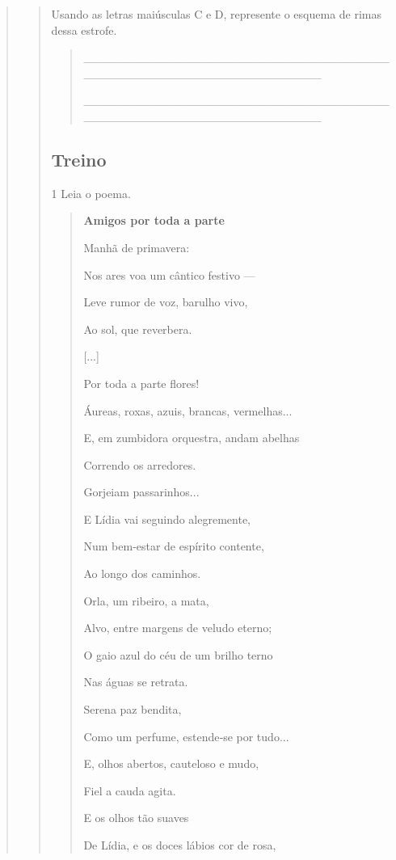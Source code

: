 \begin{quote}
\begin{quote}
Usando as letras maiúsculas C e D, represente o esquema de rimas dessa estrofe.


\begin{quote}
\_\_\_\_\_\_\_\_\_\_\_\_\_\_\_\_\_\_\_\_\_\_\_\_\_\_\_\_\_\_\_\_\_\_\_\_\_\_\_\_\_\_\_\_\_\_\_\_\_\_\_\_\_\_\_\_\_\_\_\_\_\_\_\_

\_\_\_\_\_\_\_\_\_\_\_\_\_\_\_\_\_\_\_\_\_\_\_\_\_\_\_\_\_\_\_\_\_\_\_\_\_\_\_\_\_\_\_\_\_\_\_\_\_\_\_\_\_\_\_\_\_\_\_\_\_\_\_\_
\end{quote}

\subsection{Treino}\label{treino-4}

\num{1} Leia o poema.

\begin{quote}
\textbf{Amigos por toda a parte}

Manhã de primavera:

Nos ares voa um cântico festivo ---

Leve rumor de voz, barulho vivo,

Ao sol, que reverbera.


{[}...{]}


Por toda a parte flores!

Áureas, roxas, azuis, brancas, vermelhas...

E, em zumbidora orquestra, andam abelhas

Correndo os arredores.


Gorjeiam passarinhos...

E Lídia vai seguindo alegremente,

Num bem‑estar de espírito contente,

Ao longo dos caminhos.


Orla, um ribeiro, a mata,

Alvo, entre margens de veludo eterno;

O gaio azul do céu de um brilho terno

Nas águas se retrata.


Serena paz bendita,

Como um perfume, estende‑se por tudo...

E, olhos abertos, cauteloso e mudo,

Fiel a cauda agita.


E os olhos tão suaves

De Lídia, e os doces lábios cor de rosa,


\end{quote}
\end{quote}
\end{quote}

